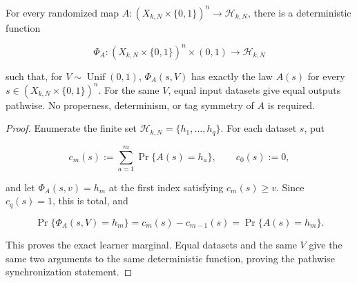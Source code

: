 \begin{lemma}\label{lem:step-011-shared-randomization}
For every randomized map
\(A:(X_{k,N}\times\{0,1\})^n\to\mathcal H_{k,N}\), there is a
deterministic function

\[
  \Phi_A:(X_{k,N}\times\{0,1\})^n\times(0,1)
  \longrightarrow\mathcal H_{k,N}
\]

such that, for \(V\sim\operatorname{Unif}(0,1)\),
\(\Phi_A(s,V)\) has exactly the law \(A(s)\) for every
\(s\in(X_{k,N}\times\{0,1\})^n\). For the same \(V\), equal input datasets give equal
outputs pathwise. No properness, determinism, or tag symmetry of \(A\) is
required.
\end{lemma}

\begin{proof}
Enumerate the finite set
\(\mathcal H_{k,N}=\{h_1,\ldots,h_q\}\). For each dataset \(s\), put

\[
  c_m(s):=\sum_{a=1}^m\Pr\{A(s)=h_a\},\qquad c_0(s):=0,
\]

and let \(\Phi_A(s,v)=h_m\) at the first index satisfying
\(c_m(s)\ge v\). Since \(c_q(s)=1\), this is total, and

\[
  \Pr\{\Phi_A(s,V)=h_m\}=c_m(s)-c_{m-1}(s)
  =\Pr\{A(s)=h_m\}.
\]

This proves the exact learner marginal. Equal datasets and the same \(V\)
give the same two arguments to the same deterministic function, proving
the pathwise synchronization statement. \end{proof}

